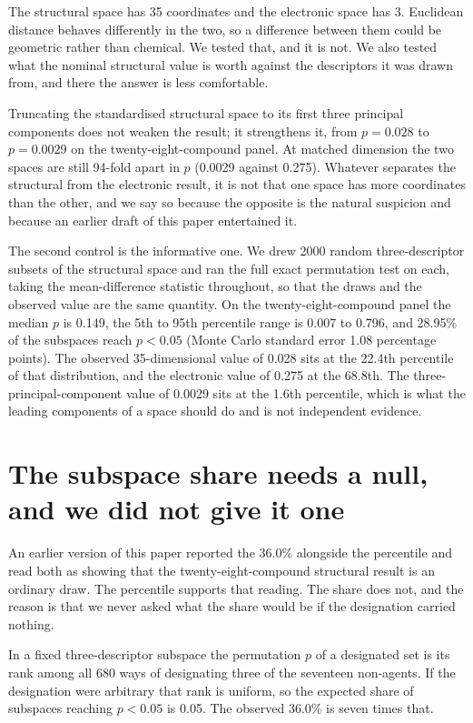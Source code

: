 \documentclass[11pt,a4paper]{article}
\begin{document}
The structural space has 35 coordinates and the electronic space has 3. Euclidean
distance behaves differently in the two, so a difference between them could be
geometric rather than chemical. We tested that, and it is not. We also tested
what the nominal structural value is worth against the descriptors it was drawn
from, and there the answer is less comfortable.

Truncating the standardised structural space to its first three principal
components does not weaken the result; it strengthens it, from $p=0.028$ to
$p=0.0029$ on the twenty-eight-compound panel. At matched dimension the two
spaces are still 94-fold apart in $p$ (0.0029 against 0.275). Whatever separates
the structural from the electronic result, it is not that one space has more
coordinates than the other, and we say so because the opposite is the natural
suspicion and because an earlier draft of this paper entertained it.

The second control is the informative one. We drew 2000 random three-descriptor
subsets of the structural space and ran the full exact permutation test on each,
taking the mean-difference statistic throughout, so that the draws and the
observed value are the same quantity.
On the twenty-eight-compound panel the median $p$ is 0.149, the 5th to 95th
percentile range is 0.007 to 0.796, and 28.95\% of the subspaces reach $p<0.05$
(Monte Carlo standard error 1.08 percentage points). The observed
35-dimensional value of 0.028 sits at the 22.4th percentile of that
distribution, and the electronic value of 0.275 at the 68.8th. The
three-principal-component value of 0.0029 sits at the 1.6th percentile, which is
what the leading components of a space should do and is not independent
evidence.

\section{The subspace share needs a null, and we did not give it one}
\label{res:subspacenull}

An earlier version of this paper reported the 36.0\% alongside the percentile
and read both as showing that the twenty-eight-compound structural result is an
ordinary draw. The percentile supports that reading. The share does not, and the
reason is that we never asked what the share would be if the designation carried
nothing.

In a fixed three-descriptor subspace the permutation $p$ of a designated set is
its rank among all 680 ways of designating three of the seventeen non-agents. If
the designation were arbitrary that rank is uniform, so the expected share of
subspaces reaching $p<0.05$ is 0.05. The observed 36.0\% is seven times that.
\end{document}
